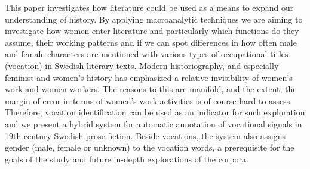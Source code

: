 This paper investigates how literature could be used as a means to expand our understanding of history. By applying macroanalytic techniques we are aiming to investigate how women enter literature and particularly which functions do they assume, their working patterns and if we can spot differences in how often male and female characters are mentioned with various types of occupational titles (vocation) in Swedish literary texts. Modern historiography, and especially feminist and women's history has emphasized a relative invisibility of women's work and women workers. The reasons to this are manifold, and the extent, the margin of error in terms of women's work activities is of course hard to assess. Therefore, vocation identification can be used as an indicator for such exploration and we present a hybrid system for automatic annotation of vocational signals in 19th century Swedish prose fiction. Beside vocations, the system also assigns gender (male, female or unknown) to the vocation words, a prerequisite for the goals of the study and future in-depth explorations of the corpora.
